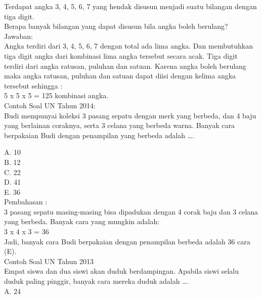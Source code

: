 \documentclass[11pt,fleqn]{book} %
\begin{document}
Terdapat angka 3, 4, 5, 6, 7 yang hendak disusun menjadi suatu bilangan dengan tiga digit. \\
Berapa banyak bilangan yang dapat disusun bila angka boleh berulang?\\

Jawaban:\\

Angka terdiri dari 3, 4, 5, 6, 7 dengan total ada lima angka. Dan membutuhkan tiga digit angka dari kombinasi lima angka tersebut secara acak. Tiga digit terdiri dari angka ratusan, puluhan dan satuan. Karena angka boleh berulang maka angka ratusan, puluhan dan satuan dapat diisi dengan kelima angka tersebut sehingga :\\

 5 x 5 x 5 = 125 kombinasi angka.\\
 
Contoh Soal UN Tahun 2014:\\

Budi mempunyai koleksi 3 pasang sepatu dengan merk yang berbeda, dan 4 baju yang berlainan coraknya, serta 3 celana yang berbeda warna. Banyak cara berpakaian Budi dengan penampilan yang berbeda adalah ….

A.   10\\

B.   12\\

C.   22\\

D.   41\\

E.   36\\

Pembahasan :\\

3 pasang sepatu masing-masing bisa dipadukan dengan 4 corak baju dan 3 celana yang berbeda. Banyak cara yang mungkin adalah:\\

3 x 4 x 3 = 36\\

Jadi, banyak cara Budi berpakaian dengan penampilan berbeda adalah 36 cara (E).\\

Contoh Soal UN Tahun 2013\\
Empat siswa dan dua siswi akan duduk berdampingan. Apabila siswi selalu duduk paling pinggir, banyak cara mereka duduk adalah ….\\

A.   24\\
\end{document}
